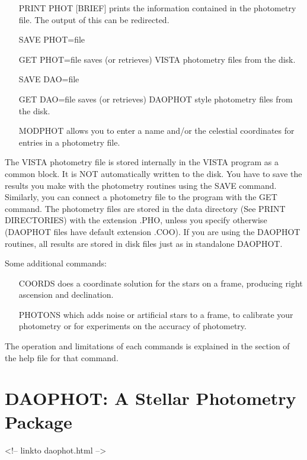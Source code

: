 \begin{itemize}
  \item[PRINT PHOT {[BRIEF]}\hfill]{prints the information contained in
       the photometry file.  The output of this can be redirected.}
  \item[SAVE PHOT=file\hfill]{}

  \item[GET PHOT=file\hfill]{saves (or retrieves) VISTA photometry
       files from the disk.}

  \item[SAVE DAO=file\hfill]{}

  \item[GET DAO=file \hfill]{saves (or retrieves) DAOPHOT style photometry
       files from the disk.}

  \item[MODPHOT\hfill]{allows you to enter a name and/or the
       celestial coordinates for entries in a photometry file.}
\end{itemize}
The VISTA photometry file is stored internally in the VISTA program as a
common block.  It is NOT automatically written to the disk. You have to
save the results you make with the photometry routines using the SAVE
command. Similarly, you can connect a photometry file to the program with
the GET command. The photometry files are stored in the data directory (See
PRINT DIRECTORIES) with the extension .PHO, unless you specify otherwise
(DAOPHOT files have default extension .COO).  If you are using the DAOPHOT
routines, all results are stored in disk files just as in standalone
DAOPHOT.

Some additional commands:
\begin{itemize}
  \item[COORDS\hfill]{does a coordinate solution for the stars
on a frame, producing right ascension and declination.}
  \item[PHOTONS\hfill]{which adds noise or artificial stars
to a frame, to calibrate your photometry
or for experiments on the accuracy of photometry.}
\end{itemize}
The operation and limitations of each commands is explained in
the section of the help file for that command. 


\section{DAOPHOT: A Stellar Photometry Package}
\begin{rawhtml}
<!-- linkto daophot.html -->
\end{rawhtml}

